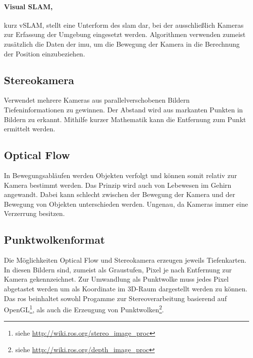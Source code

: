\paragraph*{Visual SLAM,}kurz vSLAM, stellt eine Unterform des \gls{slam} dar, bei der ausschließlich Kameras zur Erfassung der Umgebung eingesetzt werden. Algorithmen verwenden zumeist zusätzlich die Daten der \acrshort{imu}, um die Bewegung der Kamera in die Berechnung der Position einzubeziehen.

\subsection{Stereokamera}\label{chap:stereovision}
Verwendet mehrere Kameras aus parallelverschobenen Bildern Tiefeninformationen zu gewinnen. Der Abstand wird aus markanten Punkten in Bildern zu erkannt. Mithilfe kurzer Mathematik kann die Entfernung zum Punkt ermittelt werden.
\subsection{Optical Flow}
In Bewegungsabläufen werden Objekten verfolgt und können somit relativ zur Kamera bestimmt werden. Das Prinzip wird auch von Lebewesen im Gehirn angewandt. Dabei kann schlecht zwischen der Bewegung der Kamera und der Bewegung von Objekten unterschieden werden. Ungenau, da Kameras immer eine Verzerrung besitzen. 

\subsection{Punktwolkenformat}
Die Möglichkeiten Optical Flow und Stereokamera erzeugen jeweils Tiefenkarten. In diesen Bildern sind, zumeist als Graustufen, Pixel je nach Entfernung zur Kamera gekennzeichnet. Zur Umwandlung als Punktwolke muss jedes Pixel abgetastet werden um als Koordinate im 3D-Raum dargestellt werden zu können. Das \acrshort{ros} beinhaltet sowohl Progamme zur Stereoverarbeitung basierend auf OpenGL\footnote{siehe \url{http://wiki.ros.org/stereo_image_proc}}, als auch die Erzeugung von Punktwolken\footnote{siehe \url{http://wiki.ros.org/depth_image_proc}}.
